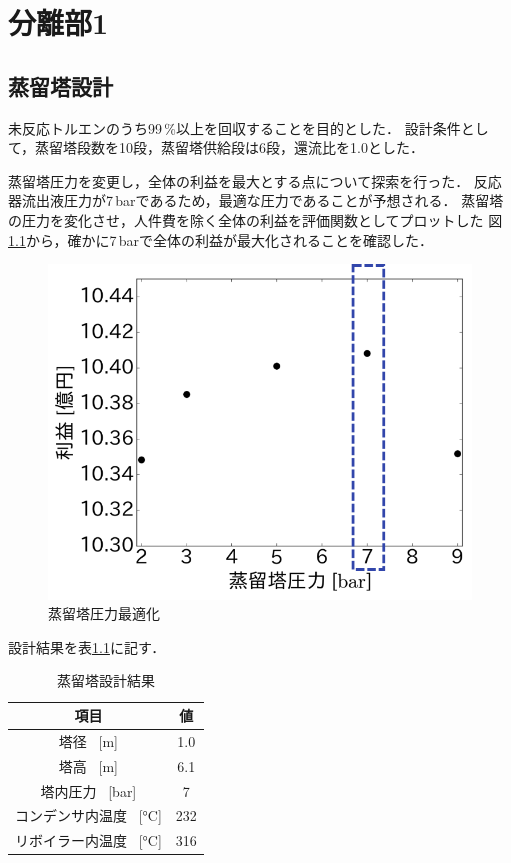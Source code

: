 \documentclass[a4j]{jsreport}
\begin{document}
\clearpage
\chapter{分離部1}
\section{蒸留塔設計}
未反応トルエンのうち99\,\%以上を回収することを目的とした．
設計条件として，蒸留塔段数を10段，蒸留塔供給段は6段，還流比を1.0とした．

蒸留塔圧力を変更し，全体の利益を最大とする点について探索を行った．
反応器流出液圧力が7\,\si{\bar}であるため，最適な圧力であることが予想される．
蒸留塔の圧力を変化させ，人件費を除く全体の利益を評価関数としてプロットした
図\ref{蒸留塔圧力最適化}から，確かに7\,\si{\bar}で全体の利益が最大化されることを確認した．
\begin{figure}[htbp]
  \centering
  \includegraphics[scale=0.7]{DistillationPressue.png}
  \caption{蒸留塔圧力最適化}
  \label{蒸留塔圧力最適化}
\end{figure}

設計結果を表\ref{蒸留塔設計結果}に記す．
\begin{table}[htbp]
  \label{蒸留塔設計結果}
  \caption{蒸留塔設計結果}
  \centering
  \begin{tabular}{cc}
      \hline
      項目 & 値 \\
      \hline
      塔径 \, [\si{\metre}] & 1.0 \\
      塔高 \, [\si{\metre}] & 6.1 \\
      塔内圧力 \, [\si{\bar}] &7 \\
      コンデンサ内温度 \, [\si{\degreeCelsius}] & 232 \\
      リボイラー内温度 \, [\si{\degreeCelsius}] & 316 \\
      \hline
  \end{tabular}
\end{table}
\end{document}
